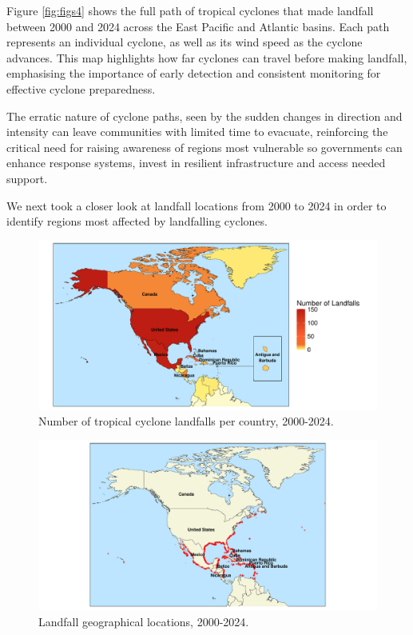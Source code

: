 \documentclass[
]{article}
\begin{document}
Figure \ref{fig:figs4} shows the full path of tropical cyclones that made landfall between 2000 and 2024 across the East Pacific and Atlantic basins. Each path represents an individual cyclone, as well as its wind speed as the cyclone advances. This map highlights how far cyclones can travel before making landfall, emphasising the importance of early detection and consistent monitoring for effective cyclone preparedness.

The erratic nature of cyclone paths, seen by the sudden changes in direction and intensity can leave communities with limited time to evacuate, reinforcing the critical need for raising awareness of regions most vulnerable so governments can enhance response systems, invest in resilient infrastructure and access needed support.

We next took a closer look at landfall locations from 2000 to 2024 in order to identify regions most affected by landfalling cyclones.

\begin{figure}

{\centering \includegraphics[width=1\linewidth]{../outputs/eda-hurricane-data/landfall-countries} 

}

\caption{Number of tropical cyclone landfalls per country, 2000-2024.}\label{fig:figs5}
\end{figure}

\begin{figure}

{\centering \includegraphics[width=1\linewidth]{../outputs/eda-hurricane-data/landfall-locations} 

}

\caption{Landfall geographical locations, 2000-2024.}\label{fig:figs6}
\end{figure}
\end{document}
